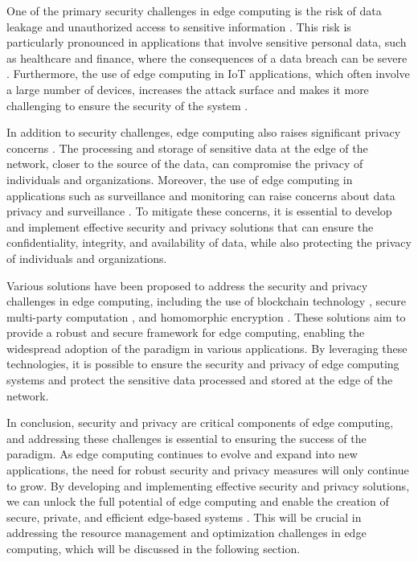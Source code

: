 \documentclass[11pt]{article}
\begin{document}
One of the primary security challenges in edge computing is the risk of data leakage and unauthorized access to sensitive information \cite{ref52}. This risk is particularly pronounced in applications that involve sensitive personal data, such as healthcare and finance, where the consequences of a data breach can be severe \cite{ref53}. Furthermore, the use of edge computing in IoT applications, which often involve a large number of devices, increases the attack surface and makes it more challenging to ensure the security of the system \cite{ref54}.

In addition to security challenges, edge computing also raises significant privacy concerns \cite{ref55}. The processing and storage of sensitive data at the edge of the network, closer to the source of the data, can compromise the privacy of individuals and organizations. Moreover, the use of edge computing in applications such as surveillance and monitoring can raise concerns about data privacy and surveillance \cite{ref56}. To mitigate these concerns, it is essential to develop and implement effective security and privacy solutions that can ensure the confidentiality, integrity, and availability of data, while also protecting the privacy of individuals and organizations.

Various solutions have been proposed to address the security and privacy challenges in edge computing, including the use of blockchain technology \cite{ref57}, secure multi-party computation \cite{ref58}, and homomorphic encryption \cite{ref59}. These solutions aim to provide a robust and secure framework for edge computing, enabling the widespread adoption of the paradigm in various applications. By leveraging these technologies, it is possible to ensure the security and privacy of edge computing systems and protect the sensitive data processed and stored at the edge of the network.

In conclusion, security and privacy are critical components of edge computing, and addressing these challenges is essential to ensuring the success of the paradigm. As edge computing continues to evolve and expand into new applications, the need for robust security and privacy measures will only continue to grow. By developing and implementing effective security and privacy solutions, we can unlock the full potential of edge computing and enable the creation of secure, private, and efficient edge-based systems \cite{ref60}. This will be crucial in addressing the resource management and optimization challenges in edge computing, which will be discussed in the following section.
\end{document}
